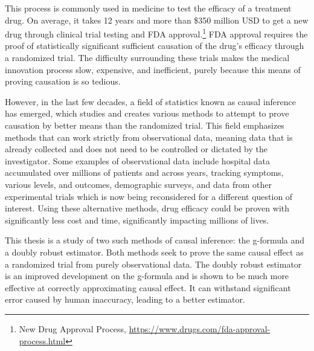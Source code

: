  This process is commonly used in medicine to test the efficacy of a treatment drug.  On average, it takes 12 years and more than \$350 million USD to get a new drug through clinical trial testing and FDA approval.\footnote{New Drug Approval Process, \url{https://www.drugs.com/fda-approval-process.html}}  FDA approval requires the proof of statistically significant sufficient causation of the drug's efficacy through a randomized trial.  The difficulty surrounding these trials makes the medical innovation process slow, expensive, and inefficient, purely because this means of proving causation is so tedious.  
 
However, in the last few decades, a field of statistics known as causal inference has emerged, which studies and creates various methods to attempt to prove causation by better means than the randomized trial.  This field emphasizes methods that can work strictly from observational data, meaning data that is already collected and does not need to be controlled or dictated by the investigator.  Some examples of observational data include hospital data accumulated over millions of patients and across years, tracking symptoms, various levels, and outcomes, demographic surveys, and data from other experimental trials which is now being reconsidered for a different question of interest.  Using these alternative methods, drug efficacy could be proven with significantly less cost and time, significantly impacting millions of lives.  

This thesis is a study of two such methods of causal inference: the g-formula and a doubly robust estimator.  Both methods seek to prove the same causal effect as a randomized trial from purely observational data.  The doubly robust estimator is an improved development on the g-formula and is shown to be much more effective at correctly approximating causal effect.  It can withstand significant error caused by human inaccuracy, leading to a better estimator.  





